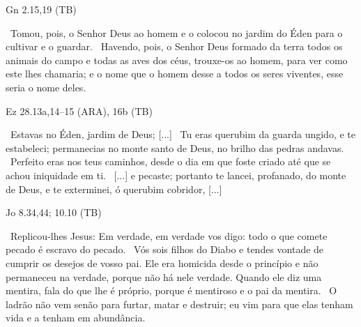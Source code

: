 \documentclass[12pt,aspectratio=169]{beamer}
\newcommand{\ver}[1]{%
    \raisebox{0.50ex}{%
        \scalebox{1.1}{%
            \pmb{\textbf{\textcolor{BSpbg}{#1}}}%
        }%
    }%
}
\newcommand{\QUOTE}[1]{%
    \par\noindent\hspace*{0.05\linewidth}%
    \begin{minipage}{0.9\linewidth}%
        \linespread{1.35}\large{#1}%
    \end{minipage}%
}
\newcommand{\RED}[1]{{\textcolor{TXred}{#1}}}
\newcommand{\YEL}[1]{{\textcolor{TXyel}{#1}}}
\newcommand{\GRE}[1]{{\textcolor{TXgre}{#1}}}
\newcommand{\MAG}[1]{{\textcolor{TXmag}{#1}}}
\begin{document}
    \begin{frame}{Gn 2.15,19 (TB)}
        \QUOTE{%
            \ver{15}~Tomou, pois, o \MAG{Senhor Deus} ao \GRE{homem} e o colocou no jardim do
            Éden \YEL{para o cultivar e o guardar}.
            \ver{19}~Havendo, pois, o \MAG{Senhor Deus} formado da terra todos os animais do
            campo e todas as aves dos céus, trouxe-os ao \GRE{homem}, para ver como \YEL{este
            lhes chamaria}; e o nome que o homem desse a todos os seres viventes, \YEL{esse
            seria o nome deles}.
        }
    \end{frame}

    \begin{frame}{Ez 28.13a,14--15 (ARA), 16b (TB)}
        \QUOTE{%
            \ver{13}~\YEL{Estavas no Éden}, jardim de Deus; [...]
            \ver{14}~Tu eras \YEL{querubim} da \YEL{guarda} ungido, e te \YEL{estabeleci};
            permanecias no monte santo de Deus, no brilho das pedras andavas.
            \ver{15}~\YEL{Perfeito} eras nos teus caminhos, desde o dia em que foste
            \YEL{criado} até que se achou \RED{iniquidade} em ti.
            \ver{16}~[...] e \RED{pecaste}; portanto te \RED{lancei, profanado}, do monte de
            Deus, e te exterminei, ó \YEL{querubim} cobridor, [...]
        }
    \end{frame}

    \begin{frame}{Jo 8.34,44; 10.10 (TB)}
        \QUOTE{%
            \ver{8.34}~Replicou-lhes Jesus: Em verdade, em verdade vos digo: \YEL{todo} o que
            comete \RED{pecado} é \RED{escravo do pecado}.
            \ver{8.44}~Vós sois filhos do \RED{Diabo} e tendes vontade de cumprir os
            \RED{desejos} de vosso pai. Ele era \RED{homicida desde o princípio} e não
            permaneceu na verdade, porque não há nele verdade. Quando ele diz uma mentira, fala
            do que lhe é próprio, porque é \RED{mentiroso} e o pai da mentira.
            \ver{10.10}~O ladrão não vem senão para \RED{furtar, matar e destruir}; eu vim para
            que elas tenham vida e a tenham em abundância.
        }
    \end{frame}

\end{document}
